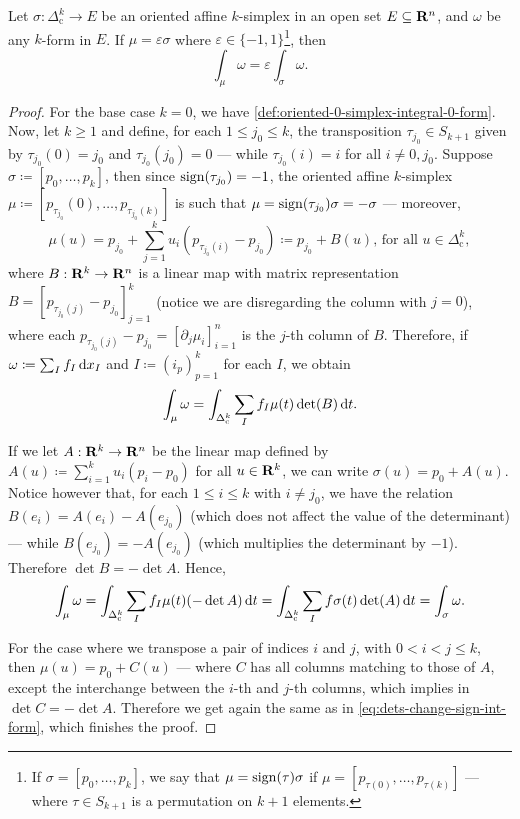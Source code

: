 \begin{proposition}\label{prop:integral-simplex-change-orientation}
Let \(\sigma: \Delta_{\text{c}}^k \to E\) be an oriented affine \(k\)-simplex in
an open set \(E \subseteq \mathbf{R}^n\), and \(\omega\) be any \(k\)-form in \(E\). If
\(\mu = \varepsilon \sigma\) where \(\varepsilon \in \{-1, 1\}\)\footnote{If
\(\sigma = [p_0, \dots, p_k]\), we say that \(\mu = \operatorname{sign}(\tau) \sigma\) if
\(\mu = [p_{\tau(0)}, \dots, p_{\tau(k)}]\) --- where \(\tau \in S_{k+1}\) is a
permutation on \(k+1\) elements.}, then
\[
  \int_{\mu} \omega = \varepsilon \int_{\sigma} \omega.
\]
\end{proposition}

\begin{proof}
For the base case \(k=0\), we have
\cref{def:oriented-0-simplex-integral-0-form}. Now, let \(k \geq 1\) and define,
for each \(1 \leq j_0 \leq k\), the transposition \(\tau_{j_0} \in S_{k+1}\)
given by \(\tau_{j_0}(0) = j_0\) and \(\tau_{j_0}(j_0) = 0\) --- while
\(\tau_{j_0}(i) = i\) for all \(i \neq 0, j_0\). Suppose \(\sigma \coloneq [p_0,
\dots, p_{k}]\), then since \(\operatorname{sign}(\tau_{j_0}) = -1\), the oriented affine
\(k\)-simplex \(\mu \coloneq [p_{\tau_{j_{0}}}(0), \dots, p_{\tau_{j_0}(k)}]\) is
such that \(\mu = \operatorname{sign}(\tau_{j_0}) \sigma = -\sigma\) --- moreover,
\[
  \mu(u) = p_{j_0} + \sum_{j=1}^k u_i (p_{\tau_{j_0}(i)} - p_{j_0})
  \coloneq p_{j_0} + B(u)
  \text{, for all } u \in \Delta_{\text{c}}^k,
\]
where \(B: \mathbf{R}^k \to \mathbf{R}^n\) is a linear map with matrix representation \(B =
[p_{\tau_{j_0}(j)} - p_{j_0}]_{j=1}^k\) (notice we are disregarding the column
with \(j = 0\)), where each \(p_{\tau_{j_0}(j)} - p_{j_0} = [\partial_j
\mu_i]_{i=1}^n\) is the \(j\)-th column of \(B\). Therefore, if \(\omega
\coloneq \sum_I f_I\, \mathrm{d} x_{I}\) and \(I \coloneq (i_p)_{p=1}^k\) for each
\(I\), we obtain
\[
  \int_{\mu} \omega
  = \int_{\Delta_{\text{c}}^k}
    \sum_I f_I \mu(t) \det(B)\, \mathrm{d} t.
\]

If we let \(A: \mathbf{R}^k \to \mathbf{R}^n\) be the linear map defined by \(A(u) \coloneq
\sum_{i=1}^k u_i (p_i - p_0)\) for all \(u \in \mathbf{R}^k\), we can write \(\sigma(u)
= p_0 + A(u)\). Notice however that, for each \(1 \leq i \leq k\) with \(i \neq
j_0\), we have the relation \(B(e_i) = A(e_i) - A(e_{j_0})\) (which does not
affect the value of the determinant) --- while \(B(e_{j_0}) = - A(e_{j_0})\)
(which multiplies the determinant by \(-1\)). Therefore \(\det B = - \det
A\). Hence,
\begin{equation}
\label{eq:dets-change-sign-int-form}
  \int_{\mu} \omega
  = \int_{\Delta_{\text{c}}^k} \sum_I f_I \mu(t) (- \det A)\, \mathrm{d} t
  = \int_{\Delta_{\text{c}}^k} \sum_{I} f \sigma(t) \det(A)\, \mathrm{d} t
  = \int_{\sigma} \omega.
\end{equation}

For the case where we transpose a pair of indices \(i\) and \(j\), with \(0 < i
< j \leq k\), then \(\mu(u) = p_0 + C(u)\) --- where \(C\) has all columns
matching to those of \(A\), except the interchange between the \(i\)-th and
\(j\)-th columns, which implies in \(\det C = - \det A\). Therefore we get again
the same as in \cref{eq:dets-change-sign-int-form}, which finishes the proof.
\end{proof}

